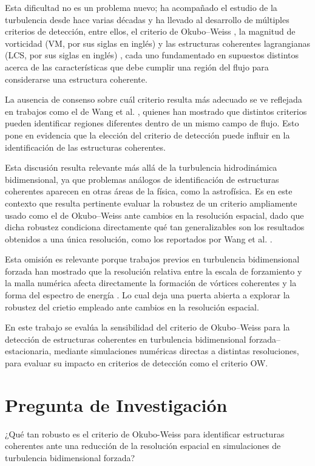 Esta dificultad no es un problema nuevo; ha acompañado el 
estudio de la turbulencia desde hace varias décadas y ha 
llevado al desarrollo de múltiples criterios de detección, 
entre ellos, el criterio de Okubo--Weiss \cite{weiss1991}, 
la magnitud de vorticidad (VM, por sus siglas en inglés) 
\cite{mcwilliams1984} y las estructuras coherentes 
lagrangianas (LCS, por sus siglas en inglés) \cite{haller2000}, 
cada uno fundamentado en supuestos distintos acerca de las 
características que debe cumplir una región del flujo para
 considerarse una estructura coherente.


La ausencia de consenso sobre cuál criterio resulta más 
adecuado se ve reflejada en trabajos como el de Wang et al. \cite{wang2023}, 
quienes han mostrado que distintos criterios pueden identificar 
regiones diferentes dentro de un mismo campo de flujo. 
Esto pone en evidencia que la elección del criterio de 
detección puede influir en la identificación de las estructuras coherentes.


Esta discusión resulta 
relevante más allá de la turbulencia hidrodinámica bidimensional, ya que problemas análogos 
de identificación de estructuras coherentes aparecen en otras áreas de la física, como la astrofísica. 
Es en este contexto que resulta pertinente evaluar la robustez de un criterio ampliamente 
usado como el de Okubo--Weiss ante cambios en la resolución espacial, dado 
que dicha robustez condiciona directamente qué tan generalizables son los 
resultados obtenidos a una única resolución, como los reportados por Wang et al. \cite{wang2023}.

Esta omisión es relevante porque trabajos previos en turbulencia bidimensional forzada han 
mostrado que la resolución relativa entre la escala de forzamiento y la malla 
numérica afecta directamente la formación de vórtices coherentes y la forma 
del espectro de energía \cite{scott2007,vallgren2011}. Lo cual deja una 
puerta abierta a explorar la robustez del crietio empleado ante cambios en la resolución espacial.

En este trabajo se evalúa la sensibilidad del 
criterio de Okubo--Weiss para la detección de 
estructuras coherentes en turbulencia bidimensional forzada--estacionaria, 
mediante simulaciones numéricas directas a distintas resoluciones, 
para evaluar su impacto en criterios de detección como el criterio OW.

\section{Pregunta de Investigación}
¿Qué tan robusto es el criterio de Okubo-Weiss para identificar estructuras
coherentes ante una reducción de la resolución espacial en simulaciones de
turbulencia bidimensional forzada?


